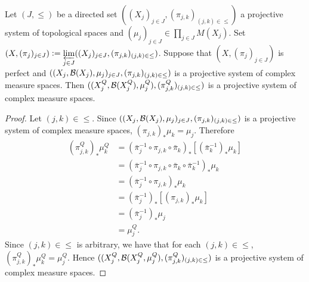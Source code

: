 \documentclass{book}
\begin{document}
\begin{ex}
	Let $(J, {\leq})$ be a directed set $((X_j)_{j \in J}, (\pi_{j,k})_{(j,k) \in {\leq}})$ a projective system of topological spaces and $(\mu_j)_{j \in J} \in \prod\limits_{j \in J} M(X_j)$. Set $(X, (\pi_j)_{j \in J}) \vcentcolon= \varprojlim\limits_{j \in J} ((X_j)_{j \in J}, (\pi_{j,k})_{(j,k) \in {\leq}})$. Suppose that $(X, (\pi_j)_{j \in J})$ is perfect and $((X_j, \mathcal{B}(X_j), \mu_j)_{j \in J}, (\pi_{j,k})_{(j,k) \in {\leq}})$ is a projective system of complex measure spaces. Then $((X^Q_j, \mathcal{B}(X^Q_j), \mu^Q_j), (\pi^Q_{j,k})_{(j,k) \in {\leq}})$ is a  projective system of complex measure spaces.
\end{ex}

\begin{proof}
	Let $(j,k) \in {\leq}$. Since $((X_j, \mathcal{B}(X_j), \mu_j)_{j \in J}, (\pi_{j,k})_{(j,k) \in {\leq}})$ is a projective system of complex measure spaces, $(\pi_{j,k})_* \mu_k = \mu_j$. Therefore
	\begin{align*}
		(\pi^Q_{j,k})_*\mu^Q_k
		& = (\bar{\pi}_j^{-1} \circ \pi_{j,k} \circ \bar{\pi}_k)_*[(\bar{\pi}_k^{-1})_*\mu_k] \\
		& = (\bar{\pi}_j^{-1} \circ \pi_{j,k} \circ \bar{\pi}_k \circ \bar{\pi}_k^{-1})_*\mu_k \\
		& = (\bar{\pi}_j^{-1} \circ \pi_{j,k})_* \mu_k \\
		& = (\bar{\pi}_j^{-1})_*[(\pi_{j,k})_* \mu_k] \\
		& = (\bar{\pi}_j^{-1})_* \mu_j \\
		& = \mu^Q_j.
	\end{align*}
	Since $(j,k) \in {\leq}$ is arbitrary, we have that for each $(j,k) \in {\leq}$, $(\pi^Q_{j,k})_*\mu^Q_k = \mu^Q_j$. Hence $((X^Q_j, \mathcal{B}(X^Q_j, \mu^Q_j), (\pi^Q_{j,k})_{(j,k) \in {\leq}})$ is a  projective system of complex measure spaces.
\end{proof}
\end{document}
